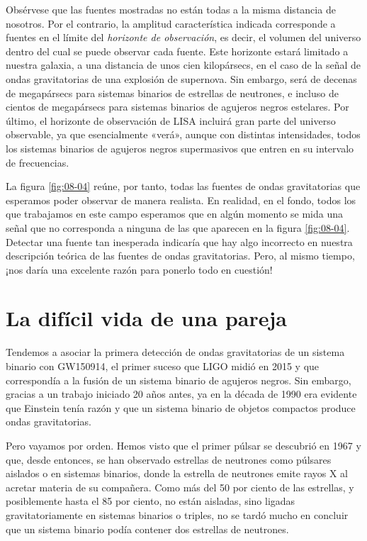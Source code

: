 Obsérvese que las fuentes mostradas no están todas a la misma distancia de nosotros. Por el contrario, la amplitud característica indicada corresponde a fuentes en el límite del \emph{horizonte de observación}, es decir, el volumen del universo dentro del cual se puede observar cada fuente. Este horizonte estará limitado a nuestra galaxia, a una distancia de unos cien kilopársecs, en el caso de la señal de ondas gravitatorias de una explosión de supernova. Sin embargo, será de decenas de megapársecs para sistemas binarios de estrellas de neutrones, e incluso de cientos de megapársecs para sistemas binarios de agujeros negros estelares. Por último, el horizonte de observación de LISA incluirá gran parte del universo observable, ya que esencialmente «verá», aunque con distintas intensidades, todos los sistemas binarios de agujeros negros supermasivos que entren en su intervalo de frecuencias.

La figura \ref{fig:08-04} reúne, por tanto, todas las fuentes de ondas gravitatorias que esperamos poder observar de manera realista. En realidad, en el fondo, todos los que trabajamos en este campo esperamos que en algún momento se mida una señal que no corresponda a ninguna de las que aparecen en la figura \ref{fig:08-04}. Detectar una fuente tan inesperada indicaría que hay algo incorrecto en nuestra descripción teórica de las fuentes de ondas gravitatorias. Pero, al mismo tiempo, ¡nos daría una excelente razón para ponerlo todo en cuestión!

\section{La difícil vida de una pareja}\label{sec:08-couple}

Tendemos a asociar la primera detección de ondas gravitatorias de un sistema binario con GW150914, el primer suceso que LIGO midió en 2015 y que correspondía a la fusión de un sistema binario de agujeros negros. Sin embargo, gracias a un trabajo iniciado 20 años antes, ya en la década de 1990 era evidente que Einstein tenía razón y que un sistema binario de objetos compactos produce ondas gravitatorias.

Pero vayamos por orden. Hemos visto que el primer púlsar se descubrió en 1967 y que, desde entonces, se han observado estrellas de neutrones como púlsares aislados o en sistemas binarios, donde la estrella de neutrones emite rayos X al acretar materia de su compañera. Como más del 50 por ciento de las estrellas, y posiblemente hasta el 85 por ciento, no están aisladas, sino ligadas gravitatoriamente en sistemas binarios o triples, no se tardó mucho en concluir que un sistema binario podía contener dos estrellas de neutrones.

